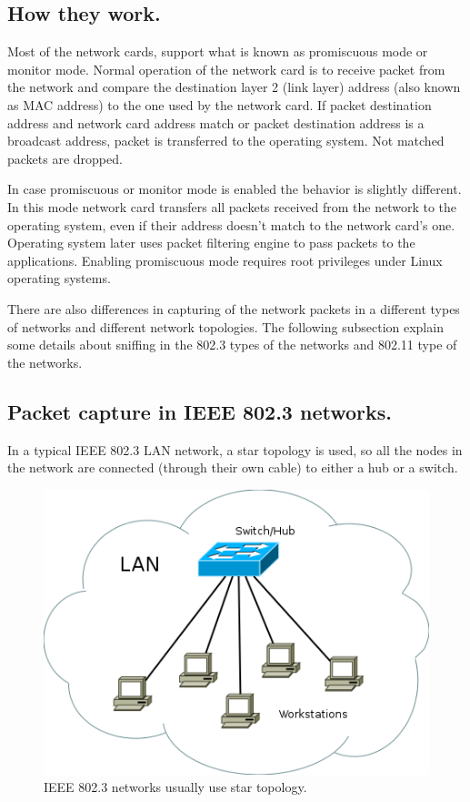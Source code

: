 \documentclass[thesis=M,english]{FITthesis}[2011/07/15]
\begin{document}
\subsection{How they work.}
Most of the network cards, support what is known as promiscuous mode or monitor mode. Normal operation of the network card is to receive packet from the network and compare the destination layer 2 (link layer) address (also known as MAC address) to the one used by the network card. If packet destination address and network card address match or packet destination address is a broadcast address, packet is transferred to the operating system. Not matched packets are dropped.

In case promiscuous or monitor mode is enabled the behavior is slightly different. In this mode network card transfers all packets received from the network to the operating system, even if their address doesn't match to the network card's one. Operating system later uses packet filtering engine to pass packets to the applications. Enabling promiscuous mode requires root privileges under Linux operating systems.

There are also differences in capturing of the network packets in a different types of networks and different network topologies. The following subsection explain some details about sniffing in the 802.3 types of the networks and 802.11 type of the networks.

\subsection{Packet capture in IEEE 802.3 networks.}
In a typical IEEE 802.3 LAN network, a star topology is used, so all the nodes in the network are connected (through their own cable) to either a hub or a switch.
\begin{figure}[h]
\centering
\includegraphics[scale=0.45]{images/IEEE802_3_LAN.png}
\caption{IEEE 802.3 networks usually use star topology.}
\label{fig:ieee802.3star_topology}
\end{figure}
\end{document}
